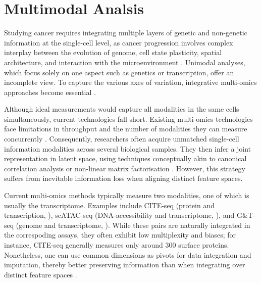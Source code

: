 \section{Multimodal Analsis}

\label{sec:modalities-multimodal-intro}

Studying cancer requires integrating multiple layers of genetic and non-genetic information at the single-cell level, as cancer progression involves complex interplay between the evolution of genome, cell state plasticity, spatial architecture, and interaction with the microenvironment . Unimodal analyses, which focus solely on one aspect such as genetics or transcription, offer an incomplete view. To capture the various axes of variation, integrative multi-omics approaches become essential \parencite{Nam2021-xt,Baysoy2023-qr}.

Although ideal measurements would capture all modalities in the same cells simultaneously, current technologies fall short. Existing multi-omics technologies face limitations in throughput and the number of modalities they can measure concurrently \parencite{Baysoy2023-qr}. Consequently, researchers often acquire unmatched single-cell information modalities across several biological samples. They then infer a joint representation in latent space, using techniques conceptually akin to canonical correlation analysis \parencite{Stuart2019-mi} or non-linear matrix factorisation \parencite{Argelaguet2018-oz,Velten2022-gc}. However, this strategy suffers from inevitable information loss when aligning distinct feature spaces.

Current multi-omics methods typically measure two modalities, one of which is usually the transcriptome. Examples include CITE-seq (protein and transcription, \textcite{Stoeckius2017-rz}), scATAC-seq (DNA-accessibility and transcriptome, \textcite{Lareau2019-xr}), and G\&T-seq (genome and transcriptome, \textcite{Macaulay2015-gh}). While these pairs are naturally integrated in the correspoding assays, they often exhibit low multiplexity and biases; for instance, CITE-seq generally measures only around 300 surface proteins. Nonetheless, one can use common dimensions as pivots for data integration and imputation, thereby better preserving information than when integrating over distinct feature spaces \parencite{Hao2021-qn}.


